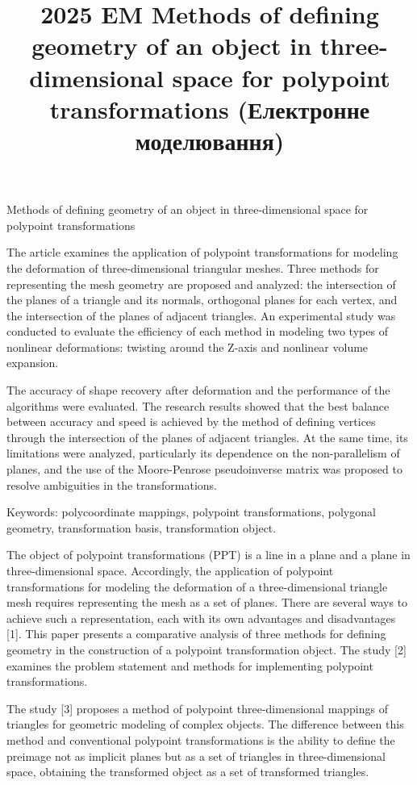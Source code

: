 \documentclass[12pt,a4paper]{article}
\begin{document}
\title{2025 EM Methods of defining geometry of an object in three-dimensional space for polypoint transformations (Електронне моделювання)}
\maketitle
Methods of defining geometry of an object in three-dimensional space for polypoint transformations
\par
The article examines the application of polypoint transformations for modeling the deformation of three-dimensional triangular meshes. Three methods for representing the mesh geometry are proposed and analyzed: the intersection of the planes of a triangle and its normals, orthogonal planes for each vertex, and the intersection of the planes of adjacent triangles. An experimental study was conducted to evaluate the efficiency of each method in modeling two types of nonlinear deformations: twisting around the Z-axis and nonlinear volume expansion.
\par
The accuracy of shape recovery after deformation and the performance of the algorithms were evaluated. The research results showed that the best balance between accuracy and speed is achieved by the method of defining vertices through the intersection of the planes of adjacent triangles. At the same time, its limitations were analyzed, particularly its dependence on the non-parallelism of planes, and the use of the Moore-Penrose pseudoinverse matrix was proposed to resolve ambiguities in the transformations.
\par
Keywords: polycoordinate mappings, polypoint transformations, polygonal geometry, transformation basis, transformation object.
\par
The object of polypoint transformations (PPT) is a line in a plane and a plane in three-dimensional space. Accordingly, the application of polypoint transformations for modeling the deformation of a three-dimensional triangle mesh requires representing the mesh as a set of planes. There are several ways to achieve such a representation, each with its own advantages and disadvantages [1]. This paper presents a comparative analysis of three methods for defining geometry in the construction of a polypoint transformation object. The study [2] examines the problem statement and methods for implementing polypoint transformations.
\par
The study [3] proposes a method of polypoint three-dimensional mappings of triangles for geometric modeling of complex objects. The difference between this method and conventional polypoint transformations is the ability to define the preimage not as implicit planes but as a set of triangles in three-dimensional space, obtaining the transformed object as a set of transformed triangles.
\end{document}
